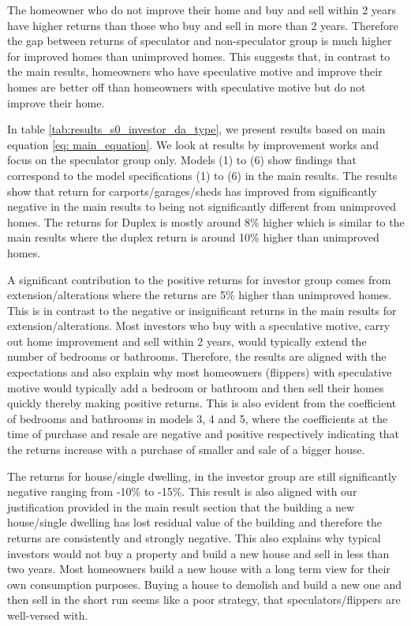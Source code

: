 \documentclass[AEJ,reqno, draftmode]{AEA} %
\begin{document}
The homeowner who do not improve their home and buy and sell within 2 years have higher returns than those who buy and sell in more than 2 years. Therefore the gap between returns of speculator and non-speculator group is much higher for improved homes than unimproved homes. This suggests that, in contrast to the main results, homeowners who have speculative motive and improve their homes are better off than homeowners with speculative motive but do not improve their home.

In table \ref{tab:results_s0_investor_da_type}, we present results based on main equation \eqref{eq: main_equation}. We look at results by improvement works and focus on the speculator group only. Models (1) to (6) show findings that correspond to the model specifications (1) to (6) in the main results. The results show that return for carports/garages/sheds has improved from significantly negative in the main results to being not significantly different from unimproved homes. The returns for Duplex is mostly around 8\% higher which is similar to the main results where the duplex return is around 10\% higher than unimproved homes. 


\restoregeometry

A significant contribution to the positive returns for investor group comes from extension/alterations where the returns are 5\% higher than unimproved homes. This is in contrast to the negative or insignificant returns in the main results for extension/alterations. Most investors who buy with a speculative motive, carry out home improvement and sell within 2 years, would typically extend the number of bedrooms or bathrooms. Therefore, the results are aligned with the expectations and also explain why most homeowners (flippers) with speculative motive would typically add a bedroom or bathroom and then sell their homes quickly thereby making positive returns. This is also evident from the coefficient of bedrooms and bathrooms in models 3, 4 and 5, where the coefficients at the time of purchase and resale are negative and positive respectively indicating that the returns increase with a purchase of smaller and sale of a bigger house.

The returns for house/single dwelling, in the investor group are still significantly negative ranging from -10\% to -15\%. This result is also aligned with our justification provided in the main result section that the building a new house/single dwelling has lost residual value of the building and therefore the returns are consistently and strongly negative. This also explains why typical investors would not buy a property and build a new house and sell in less than two years. Most homeowners build a new house with a long term view for their own consumption purposes. Buying a house to demolish and build a new one and then sell in the short run seems like a poor strategy, that speculators/flippers are well-versed with.
\end{document}

